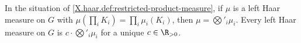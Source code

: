 In the situation of \cref{X.haar.def:restricted-product-measure}, if $\mu$ is a left Haar measure on $G$ with
$\mu(\prod_iK_i)=\prod_i\mu_i(K_i)$, then $\mu=\bigotimes'_i\mu_i$. Every left Haar measure on $G$ is
$c\cdot\bigotimes'_i\mu_i$ for a unique $c\in\R_{>0}$.
